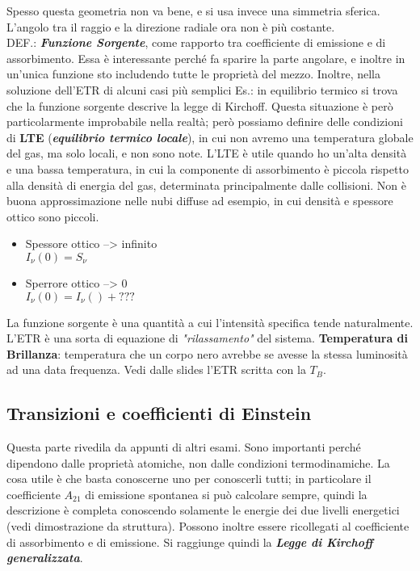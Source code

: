 Spesso questa geometria non va bene, e si usa invece una simmetria sferica.
L'angolo tra il raggio e la direzione radiale ora non è più costante.\\
DEF.: \textbf{\textit{Funzione Sorgente}}, come rapporto tra coefficiente di emissione e di assorbimento. Essa è interessante perché fa sparire la parte angolare, e inoltre in un'unica funzione sto includendo tutte le proprietà del mezzo.
Inoltre, nella soluzione dell'ETR di alcuni casi più semplici 
Es.: in equilibrio termico si trova che la funzione sorgente descrive la legge di Kirchoff.
Questa situazione è però particolarmente improbabile nella realtà; però possiamo definire delle condizioni di \textbf{LTE} (\textit{\textbf{equilibrio termico locale}}), in cui non avremo una temperatura globale del gas, ma solo locali, e non sono note.
L'LTE è utile quando ho un'alta densità e una bassa temperatura, in cui la componente di assorbimento è piccola rispetto alla densità di energia del gas, determinata principalmente dalle collisioni.
Non è buona approssimazione nelle nubi diffuse ad esempio, in cui densità e spessore ottico sono piccoli.
\begin{itemize}
    \item Spessore ottico --> infinito\\
    $I_{\nu}(0) = S_{\nu}$
    \item Sperrore ottico --> 0\\
    $I_{\nu}(0) = I_{\nu}() +???$
\end{itemize}
La funzione sorgente è una quantità a cui l'intensità specifica tende naturalmente.
L'ETR è una sorta di equazione di \textit{"rilassamento"} del sistema.
\textbf{Temperatura di Brillanza}: temperatura che un corpo nero avrebbe se avesse la stessa luminosità ad una data frequenza.
Vedi dalle slides l'ETR scritta con la $T_{B}$.\\
\subsection*{Transizioni e coefficienti di Einstein}
Questa parte rivedila da appunti di altri esami.
Sono importanti perché dipendono dalle proprietà atomiche, non dalle condizioni termodinamiche. La cosa utile è che basta conoscerne uno per conoscerli tutti; in particolare il coefficiente $A_{21}$ di emissione spontanea si può calcolare sempre, quindi la descrizione è completa conoscendo solamente le energie dei due livelli energetici (vedi dimostrazione da struttura).
Possono inoltre essere ricollegati al coefficiente di assorbimento e di emissione.
Si raggiunge quindi la \textbf{\textit{Legge di Kirchoff generalizzata}}.
